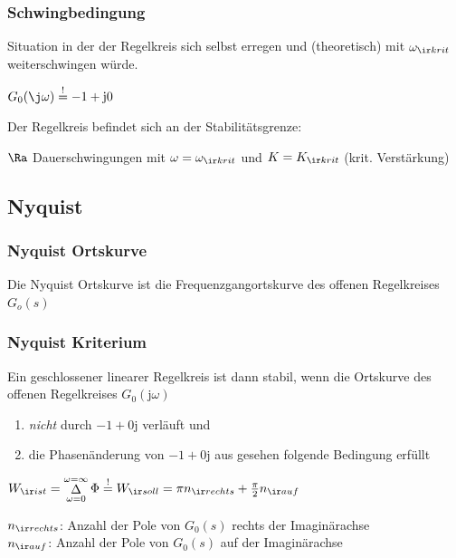\documentclass[german]{latex4ei/latex4ei_sheet}
\renewcommand{\i}{\mathrm{j}}
\begin{document}
\begin{sectionbox}
	\subsubsection{Schwingbedingung}
	Situation in der der Regelkreis sich selbst erregen und (theoretisch) mit $\omega_{\ir krit}$  weiterschwingen würde.\\

	\begin{emphbox}$G_0 (\j \omega) \overset{!}{=} -1 + \i 0$\end{emphbox}

	Der Regelkreis befindet sich an der Stabilitätsgrenze:

	$\Ra$ Dauerschwingungen mit $\omega = \omega_{\ir krit}$ und $K = K_{\ir krit}$ (krit. Verstärkung)
\end{sectionbox}

\begin{sectionbox}
	\subsection{Nyquist}
	\subsubsection{Nyquist Ortskurve}

	Die Nyquist Ortskurve ist die Frequenzgangortskurve des offenen Regelkreises $G_o (s)$

	\subsubsection{Nyquist Kriterium}

	Ein geschlossener linearer Regelkreis ist dann stabil, wenn die Ortskurve des offenen Regelkreises $G_0(\i \omega)$
	\begin{enumerate}
		\item \emph{nicht} durch $-1 + 0\i$ verläuft und
		\item die Phasenänderung von $-1 + 0\i$ aus gesehen folgende Bedingung erfüllt
	\end{enumerate}
	\begin{emphbox}$W_{\ir ist} = \mathop{\Delta}\limits_{\omega = 0}^{\omega = \infty} \Phi \stackrel{!}{=} W_{\ir soll} = \pi n_{\ir rechts} + \frac{\pi}{2} n_{\ir auf}$\end{emphbox}
	$n_{\ir rechts}$: Anzahl der Pole von $G_0(s)$ rechts der Imaginärachse\\
	$n_{\ir auf}$: Anzahl der Pole von $G_0(s)$ auf der Imaginärachse
\end{sectionbox}
\end{document}
